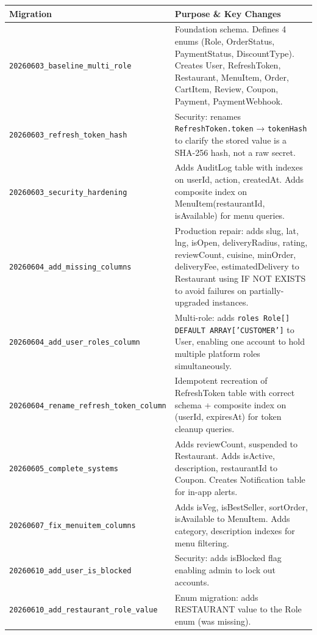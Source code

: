 \documentclass[11pt,a4paper,twoside]{book}
\newcommand{\th}[1]{\textbf{\color{white}#1}}
\begin{document}
\begin{center}\footnotesize
\begin{longtable}{p{5.5cm}p{7.5cm}}
\toprule
\rowcolor{headbg}\th{Migration} & \th{Purpose \& Key Changes} \\
\midrule
\texttt{20260603\_baseline\_multi\_role} &
  Foundation schema. Defines 4 enums (Role, OrderStatus, PaymentStatus, DiscountType).
  Creates User, RefreshToken, Restaurant, MenuItem, Order, CartItem, Review,
  Coupon, Payment, PaymentWebhook. \\
\rowcolor{rowalt}\texttt{20260603\_refresh\_token\_hash} &
  Security: renames \texttt{RefreshToken.token} → \texttt{tokenHash} to clarify
  the stored value is a SHA-256 hash, not a raw secret. \\
\texttt{20260603\_security\_hardening} &
  Adds AuditLog table with indexes on userId, action, createdAt.
  Adds composite index on MenuItem(restaurantId, isAvailable) for menu queries. \\
\rowcolor{rowalt}\texttt{20260604\_add\_missing\_columns} &
  Production repair: adds slug, lat, lng, isOpen, deliveryRadius, rating,
  reviewCount, cuisine, minOrder, deliveryFee, estimatedDelivery to Restaurant
  using IF NOT EXISTS to avoid failures on partially-upgraded instances. \\
\texttt{20260604\_add\_user\_roles\_column} &
  Multi-role: adds \texttt{roles Role[] DEFAULT ARRAY['CUSTOMER']} to User,
  enabling one account to hold multiple platform roles simultaneously. \\
\rowcolor{rowalt}\texttt{20260604\_rename\_refresh\_token\_column} &
  Idempotent recreation of RefreshToken table with correct schema + composite
  index on (userId, expiresAt) for token cleanup queries. \\
\texttt{20260605\_complete\_systems} &
  Adds reviewCount, suspended to Restaurant. Adds isActive, description,
  restaurantId to Coupon. Creates Notification table for in-app alerts. \\
\rowcolor{rowalt}\texttt{20260607\_fix\_menuitem\_columns} &
  Adds isVeg, isBestSeller, sortOrder, isAvailable to MenuItem.
  Adds category, description indexes for menu filtering. \\
\texttt{20260610\_add\_user\_is\_blocked} &
  Security: adds isBlocked flag enabling admin to lock out accounts. \\
\rowcolor{rowalt}\texttt{20260610\_add\_restaurant\_role\_value} &
  Enum migration: adds RESTAURANT value to the Role enum (was missing). \\

\end{longtable}
\end{center}
\end{document}
